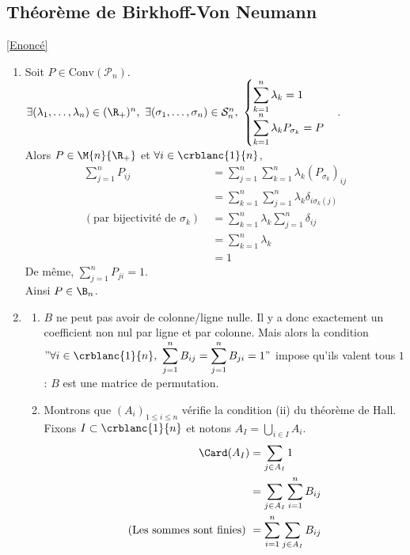 \documentclass{book}
\begin{document}
	\subsection{Théorème de Birkhoff-Von Neumann }
	\label{sec:theoreme-de-birkhoff-von-neumann-etoile4}
	\textcolor{blue}{\hyperref[Théorème de Birkhoff-Von Neumann]{[Enoncé]}}\\
	\begin{enumerate}[leftmargin=*]
		\item Soit $P\in \text{Conv}(\mathcal P_n)$. $\exists (\lambda_1,\dots,\lambda_n)\in (\R_+)^n,\ \exists (\sigma_1,\dots,\sigma_n)\in \mathcal S_n^n,\ \begin{cases}
			\displaystyle\sum_{k=1}^n\lambda_k=1\\
			\displaystyle\sum_{k=1}^n\lambda_kP_{\sigma_k}=P
		\end{cases}$.\\
		Alors $P\in\M{n}{\R_+}$ et $\forall i\in \crblanc{1}{n}$,
		\begin{align*}
			\sum_{j=1}^nP_{ij}&=\sum_{j=1}^n\sum_{k=1}^n\lambda_k(P_{\sigma_k})_{ij}\\
			&=\sum_{k=1}^n\sum_{j=1}^n\lambda_k\delta_{i\sigma_k(j)}\\
			(\text{par bijectivité de }\sigma_k)\ &=\sum_{k=1}^n\lambda_k\sum_{j=1}^n\delta_{ij}\\
			&=\sum_{k=1}^n\lambda_k\\
			&=1
		\end{align*}
		De même, $\displaystyle\sum_{j=1}^nP_{ji}=1$.\\
		Ainsi $P\in \B_n$.
		\item \begin{enumerate}[label=\alph*.]
			\item $B$ ne peut pas avoir de colonne/ligne nulle. Il y a donc exactement un coefficient non nul par ligne et par colonne. Mais alors la condition $"\forall i\in \crblanc{1}{n},\ \displaystyle\sum_{j=1}^nB_{ij}=\sum_{j=1}^nB_{ji}=1"$ impose qu'ils valent tous $1$ : $B$ est une matrice de permutation.
			\item Montrons que $(A_i)_{1\leq i\leq n}$ vérifie la condition (ii) du théorème de Hall. Fixons $I\subset \crblanc{1}{n}$ et notons $A_I=\displaystyle\bigcup_{i\in I}A_i$.\\
			\begin{align*}
				\Card(A_I)&=\sum_{j\in A_I}1\\
				&=\sum_{j\in A_I}\sum_{i=1}^nB_{ij}\\
				\text{(Les sommes sont finies) }&=\sum_{i=1}^n\sum_{j\in A_I}B_{ij}\\

\end{align*}
\end{enumerate}
\end{enumerate}
\end{document}
